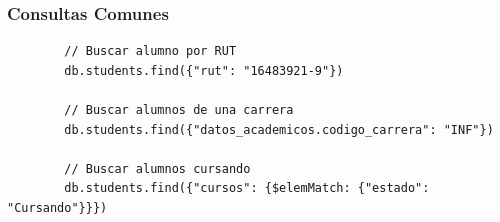 \documentclass[12pt,a4paper]{article}
\begin{document}
	\subsubsection{Consultas Comunes}
	
	\begin{verbatim}
		// Buscar alumno por RUT
		db.students.find({"rut": "16483921-9"})
		
		// Buscar alumnos de una carrera
		db.students.find({"datos_academicos.codigo_carrera": "INF"})
		
		// Buscar alumnos cursando
		db.students.find({"cursos": {$elemMatch: {"estado": "Cursando"}}})
	\end{verbatim}
	
\end{document}
